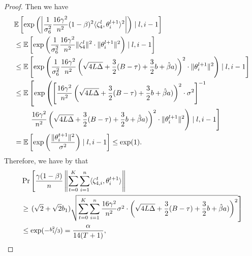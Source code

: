 \documentclass[a4paper,11pt]{article}
\begin{document}
\begin{proof}
     Then we have 
    \begin{align*}
    &\E{\exp\left(\left|\frac{1}{\sigma_6^2}\frac{16\gamma^2}{n^2}(1-\beta)^2\<\zeta^l_{4},\theta^{l+1}_i>^2\right|\right)\mid l,i-1 }\\
    &\le 
    \E{\exp\left(\frac{1}{\sigma_6^2}\frac{16\gamma^2}{n^2}\|\zeta_{4}^l\|^2 \cdot \|\theta^{l+1}_i\|^2\right)\mid l,i-1}\\
    &\le \E{\exp\left(\frac{1}{\sigma^2_6}\frac{16\gamma^2}{n^2}\left(\sqrt{4L\Delta} +\frac{3}{2}(B-\tau) + \frac{3}{2}b + \hat{\beta}a)\right)^2\cdot \|\theta^{l+1}_i\|^2\right)\mid l,i-1}\\
    &\le \mathbb{E}\left[\exp\left(\left[\frac{16\gamma^2}{n^2}\left(\sqrt{4L\Delta} +\frac{3}{2}(B-\tau) + \frac{3}{2}b + \hat{\beta}a)\right)^2\cdot \sigma^2\right]^{-1} \right.\right.\\
    &\qquad\left.\left. \frac{16\gamma^2}{n^2}\left(\sqrt{4L\Delta} +\frac{3}{2}(B-\tau) + \frac{3}{2}b + \hat{\beta}a)\right)^2\cdot\|\theta^{l+1}_i\|^2\right)\mid l,i-1\right]\\
    &= \E{\exp\left(\frac{\|\theta^{t+1}_i\|^2}{\sigma^2}\right)\mid l,i-1} \le \exp(1).
    \end{align*}
    Therefore, we have by  that 
    \begin{align*}
    &\Pr\left[\frac{\gamma(1-\beta)}{n}\left\|\sum_{t=0}^K\sum_{i=1}^n\<\zeta_{4,i}^t,\theta^{t+1}_i>\right\|\right.\\ 
    &\ge \left. (\sqrt{2}+\sqrt{2}b_1)\sqrt{\sum_{t=0}^K\sum_{i=1}^n \frac{16\gamma^2}{n^2}\sigma^2\cdot \left(\sqrt{4L\Delta} +\frac{3}{2}(B-\tau) + \frac{3}{2}b + \hat{\beta} a)\right)^2}\right]\\ 
    &\le \exp(-\nicefrac{b_1^2}{3}) = \frac{\alpha}{14(T+1)},
    \end{align*}
    

\end{proof}
\end{document}
